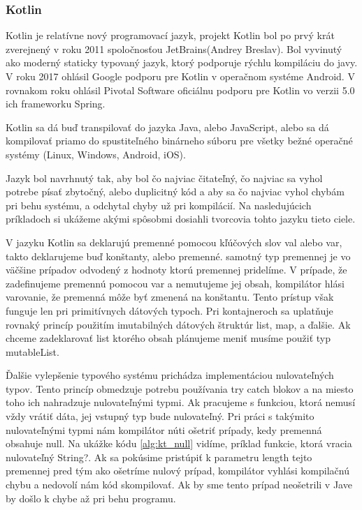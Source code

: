 \subsubsection{Kotlin}
Kotlin je relatívne nový programovací jazyk, projekt Kotlin bol po prvý krát zverejnený v roku 2011 spoločnosťou JetBrains(Andrey Breslav). Bol vyvinutý ako moderný staticky typovaný jazyk, ktorý podporuje rýchlu kompiláciu do javy. V roku 2017 ohlásil Google podporu pre Kotlin v operačnom systéme Android. V rovnakom roku ohlásil Pivotal Software oficiálnu podporu pre Kotlin vo verzii 5.0 ich frameworku Spring.

Kotlin sa dá buď transpilovať do jazyka Java, alebo JavaScript, alebo sa dá kompilovať priamo do spustiteľného binárneho súboru pre všetky bežné operačné systémy (Linux, Windows, Android, iOS).

Jazyk bol navrhnutý tak, aby bol čo najviac čitateľný, čo najviac sa vyhol potrebe písať zbytočný, alebo duplicitný kód a aby sa čo najviac vyhol chybám pri behu systému, a odchytal chyby už pri kompilácií. Na nasledujúcich príkladoch si ukážeme akými spôsobmi dosiahli tvorcovia tohto jazyku tieto ciele. 

V jazyku Kotlin sa deklarujú premenné pomocou kľúčových slov val alebo var, takto deklarujeme buď konštanty, alebo premenné. samotný typ premennej je vo väčšine prípadov odvodený z hodnoty ktorú premennej pridelíme. V prípade, že zadefinujeme premennú pomocou var a nemutujeme jej obsah, kompilátor hlási varovanie, že premenná môže byť zmenená na konštantu. Tento prístup však funguje len pri primitívnych dátových typoch. Pri kontajneroch sa uplatňuje rovnaký princíp použitím imutabilných dátových štruktúr list, map, a ďalšie. Ak chceme zadeklarovať list ktorého obsah plánujeme meniť musíme použiť typ mutableList. 

Ďalšie vylepšenie typového systému prichádza implementáciou nulovateľných typov. Tento princíp obmedzuje potrebu používania try catch blokov a na miesto toho ich nahradzuje nulovateľnými typmi. Ak pracujeme s funkciou, ktorá nemusí vždy vrátiť dáta, jej vstupný typ bude nulovateľný. Pri práci s takýmito nulovateľnými typmi nám kompilátor núti ošetriť prípady, kedy premenná obsahuje null. Na ukážke kódu \ref{alg:kt_null} vidíme, príklad funkcie, ktorá vracia nulovateľný String?. Ak sa pokúsime pristúpiť k parametru length tejto premennej pred tým ako ošetríme nulový prípad, kompilátor vyhlási kompilačnú chybu a nedovolí nám kód skompilovať. Ak by sme tento prípad neošetrili v Jave by došlo k chybe až pri behu programu. 

